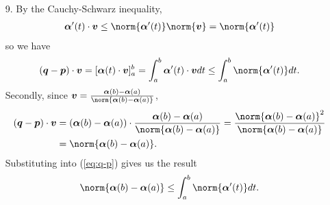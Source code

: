 \documentclass[a4paper,12pt]{article}
\newcommand{\bs}{\boldsymbol}
\theoremstyle{remark}
\newtheorem{remark}{Remark}
\begin{document}
\begin{enumerate}
        Since $C$ is in the plane, any vector perpendicular to $\bs{N}(s)$, such as $\bs{N}'(s)$ by Lemma \ref{lem:N-perp}, must be parallel to $\bs{T}(s)$, and its magnitude must be its dot product with $\bs{T}(s)$, since $\bs{T}(s)$ has unit length. Then the magnitude of $\bs{N}'(s)$ is given by
        \begin{align*}
            \bs{N}'(s) \cdot \bs{T}(s) = -\bs{N}(s) \cdot \bs{T}'(s) = -\frac{\bs{T}'(s)}{\norm{\bs{T}'(s)}} \cdot \bs{T}'(s) = -\frac{\kappa^2(s)}{\kappa(s)} = -\kappa(s).
        \end{align*}
        Combining these results yields
        \begin{align*}
            \bs{N}'(s) = -\kappa(s) \bs{T}(s).
        \end{align*}
        \begin{remark}
            By applying the quotient rule to $\bs{N}(s) = \bs{T}'(s)/\kappa(s)$, we have
            \begin{align*}
                \bs{N}'(s) = \frac{\kappa(s) \bs{T}''(s) - \kappa'(s) \bs{T}'(s)}{\kappa^2(s)},
            \end{align*}
            allowing us to obtain another identity
            \begin{align*}
                \kappa(s) \bs{T}''(s) - \kappa'(s) \bs{T}'(s) + \kappa^3(s) \bs{T}(s) = 0.
            \end{align*}
        \end{remark}

    \item[9.]
        By the Cauchy-Schwarz inequality,
        \begin{align*}
            \bs{\alpha}'(t) \cdot \bs{v} \leq \norm{\bs{\alpha}'(t)} \norm{\bs{v}} = \norm{\bs{\alpha}'(t)}
        \end{align*}
        so we have
        \begin{align} \label{eq:q-p}
            (\bs{q} - \bs{p}) \cdot \bs{v} = [\bs{\alpha}(t) \cdot \bs{v}]_a^b = \int_a^b \bs{\alpha}'(t) \cdot \bs{v} dt \leq \int_a^b \norm{\bs{\alpha}'(t)} dt.
        \end{align}
        Secondly, since $\bs{v} = \frac{\bs{\alpha}(b) - \bs{\alpha}(a)}{\norm{\bs{\alpha}(b) - \bs{\alpha}(a)}}$,
        \begin{align*}
            (\bs{q} - \bs{p}) \cdot \bs{v} &= (\bs{\alpha}(b) - \bs{\alpha}(a)) \cdot \frac{\bs{\alpha}(b) - \bs{\alpha}(a)}{\norm{\bs{\alpha}(b) - \bs{\alpha}(a)}} = \frac{\norm{\bs{\alpha}(b) - \bs{\alpha}(a)}^2}{\norm{\bs{\alpha}(b) - \bs{\alpha}(a)}} \\
            &= \norm{\bs{\alpha}(b) - \bs{\alpha}(a)}.
        \end{align*}
        Substituting into (\ref{eq:q-p}) gives us the result
        \begin{align*}
            \norm{\bs{\alpha}(b) - \bs{\alpha}(a)} \leq \int_a^b \norm{\bs{\alpha}'(t)} dt.
        \end{align*}


\end{enumerate}
\end{document}
